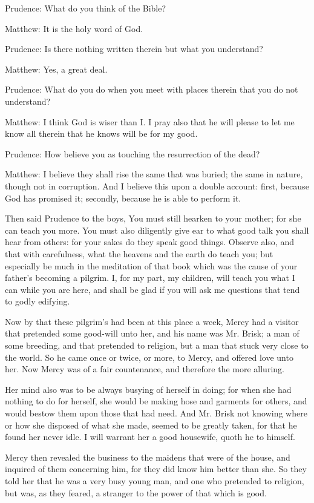 Prudence: What do you think of the Bible?

Matthew: It is the holy word of God.

Prudence: Is there nothing written therein but what you understand?

Matthew: Yes, a great deal.

Prudence: What do you do when you meet with places therein that you do not understand?

Matthew: I think God is wiser than I. I pray also that he will please to let me know all therein that he knows will be for my good.

Prudence: How believe you as touching the resurrection of the dead?

Matthew: I believe they shall rise the same that was buried; the same in nature, though not in corruption. And I believe this upon a double account: first, because God has promised it; secondly, because he is able to perform it.

Then said Prudence to the boys, You must still hearken to your mother; for she can teach you more. You must also diligently give ear to what good talk you shall hear from others: for your sakes do they speak good things. Observe also, and that with carefulness, what the heavens and the earth do teach you; but especially be much in the meditation of that book which was the cause of your father's becoming a pilgrim. I, for my part, my children, will teach you what I can while you are here, and shall be glad if you will ask me questions that tend to godly edifying.

Now by that these pilgrim's had been at this place a week, Mercy had a visitor that pretended some good-will unto her, and his name was Mr. Brisk; a man of some breeding, and that pretended to religion, but a man that stuck very close to the world. So he came once or twice, or more, to Mercy, and offered love unto her. Now Mercy was of a fair countenance, and therefore the more alluring.

Her mind also was to be always busying of herself in doing; for when she had nothing to do for herself, she would be making hose and garments for others, and would bestow them upon those that had need. And Mr. Brisk not knowing where or how she disposed of what she made, seemed to be greatly taken, for that he found her never idle. I will warrant her a good housewife, quoth he to himself.

Mercy then revealed the business to the maidens that were of the house, and inquired of them concerning him, for they did know him better than she. So they told her that he was a very busy young man, and one who pretended to religion, but was, as they feared, a stranger to the power of that which is good.

